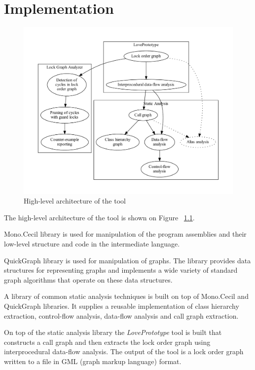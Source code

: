 \chapter{Implementation}

\begin{figure}
\begin{center}
\includegraphics[scale=0.5]{Architecture.pdf}
\caption{High-level architecture of the tool}
\label{fig:architecture}
\end{center}
\end{figure}

The high-level architecture of the tool is shown on Figure ~\ref{fig:architecture}.

Mono.Cecil \citep{MonoCecil} library is used for manipulation of the program assemblies and their low-level structure and code in the intermediate language.

QuickGraph \citep{QuickGraph} library is used for manipulation of graphs. The library provides data structures for representing graphs and implements a wide variety of standard graph algorithms that operate on these data structures.

A library of common static analysis techniques is built on top of Mono.Cecil and QuickGraph libraries. It supplies a reusable implementation of class hierarchy extraction, control-flow analysis, data-flow analysis and call graph extraction.

On top of the static analysis library the \emph{LovePrototype} tool is built that constructs a call graph and then extracts the lock order graph using interprocedural data-flow analysis. The output of the tool is a lock order graph written to a file in GML (graph markup language) format.


